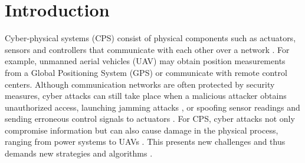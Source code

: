 \documentclass[../../thesis.tex]{subfiles}
\begin{document}



\section{Introduction}

Cyber-physical systems (CPS) consist of physical components such as actuators, sensors and controllers that communicate with each other over a network \cite{kim2012cyber}. For example, unmanned aerial vehicles (UAV) may obtain position measurements from a Global Positioning System (GPS) or communicate with remote control centers. Although communication networks are often protected by security measures, cyber attacks can still take place when a malicious attacker obtains unauthorized access, launching jamming attacks \cite{Gligor}, 
or spoofing sensor readings and sending erroneous control signals to actuators \cite{Mo}. For CPS, cyber attacks not only compromise information but can also cause damage in the physical process, ranging from power systems \cite{teixeira2010cyber, liu2011false} to UAVs \cite{Hu:2016uav}. This presents new challenges and thus demands new strategies and algorithms \cite{Sastry}.
\end{document}
